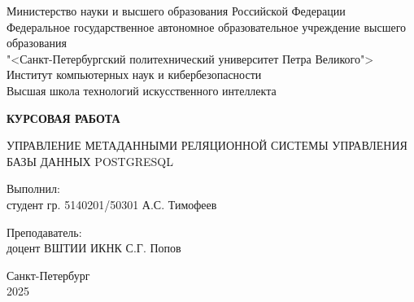 \thispagestyle{empty}

\begin{center}
    Министерство науки и высшего образования Российской Федерации \\
    Федеральное государственное автономное образовательное учреждение высшего образования \\
    "<Санкт-Петербургский политехнический университет Петра Великого"> \\
    Институт компьютерных наук и кибербезопасности \\ Высшая школа технологий искусственного интеллекта
\end{center}

\vspace{1cm}

\begin{center}
	\textbf{КУРСОВАЯ РАБОТА}
	
		УПРАВЛЕНИЕ МЕТАДАННЫМИ РЕЛЯЦИОННОЙ СИСТЕМЫ УПРАВЛЕНИЯ БАЗЫ ДАННЫХ POSTGRESQL
\end{center}

\vfill

    \noindent Выполнил: \\
    {студент гр. 5140201/50301 \hfill А.С. Тимофеев}

    \vspace{20pt}

    \noindent Преподаватель: \\
    {доцент ВШТИИ ИКНК \hfill С.Г. Попов}

\vfill

\begin{center}
    Санкт-Петербург\\
    2025
\end{center}
